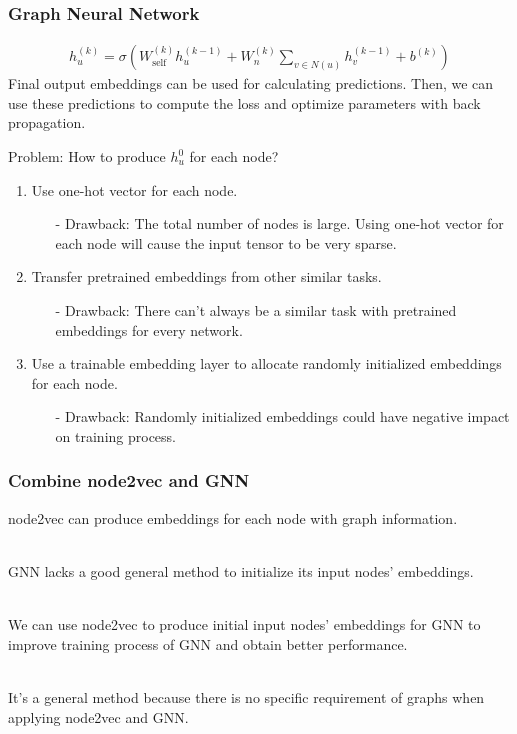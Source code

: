 \documentclass[notes, 10pt, aspectratio=169]{beamer}
\begin{document}
\begin{frame}
    \frametitle{Graph Neural Network}
    \begin{align*}
        \displaystyle
        h_u^{(k)} = \sigma( W_{\text{self}}^{(k)} h_u^{(k-1)} + W_n^{(k)}\sum_{v\in N(u)} h_v^{(k-1)} + b^{(k)} ) 
    \end{align*}
    Final output embeddings can be used for calculating predictions. Then, we can use these predictions to compute the loss and optimize parameters with back propagation.\par \vspace{0.2cm}
    Problem: How to produce $h_u^0$ for each node?
    \begin{enumerate}
        \item Use one-hot vector for each node.
            \begin{itemize}
                \item[-] Drawback: The total number of nodes is large. Using one-hot vector for each node will cause the input tensor to be very sparse.
            \end{itemize} 
        \item Transfer pretrained embeddings from other similar tasks.
            \begin{itemize}
                \item[-] Drawback: There can't always be a similar task with pretrained embeddings for every network.
            \end{itemize}
        \item Use a trainable embedding layer to allocate randomly initialized embeddings for each node.
            \begin{itemize}
                \item[-] Drawback: Randomly initialized embeddings could have negative impact on training process.
            \end{itemize}
    \end{enumerate}
\end{frame}

\begin{frame}
    \frametitle{Combine node2vec and GNN}
    node2vec can produce embeddings for each node with graph information.\par ~\\
    GNN lacks a good general method to initialize its input nodes’ embeddings.\par ~\\
    We can use node2vec to produce initial input nodes’ embeddings for GNN to improve training process of GNN and obtain better performance.\par ~\\
    It’s a general method because there is no specific requirement of graphs when applying node2vec and GNN.
\end{frame}
\end{document}
